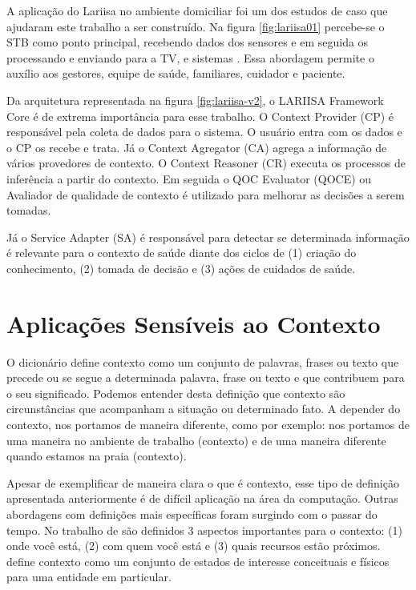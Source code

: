 A aplicação do Lariisa no ambiente domiciliar foi um dos estudos de caso que ajudaram
este trabalho a ser construído. Na figura \ref{fig:lariisa01} percebe-se o STB como 
ponto principal, recebendo dados dos sensores e em seguida os processando e enviando
para a TV, \smartphones[] e sistemas \web. Essa abordagem permite o auxílio aos
gestores, equipe de saúde, familiares, cuidador e paciente.


Da arquitetura representada na figura \ref{fig:lariisa-v2}, o LARIISA Framework
Core é de extrema importância para esse trabalho. O Context Provider (CP) é
responsável pela coleta de dados para o sistema. O usuário entra com os dados
e o CP os recebe e trata. Já o Context Agregator (CA) agrega a informação de
vários provedores de contexto. O Context Reasoner (CR) executa os processos de
inferência a partir do contexto. Em seguida o QOC Evaluator (QOCE) ou Avaliador
de qualidade de contexto é utilizado para melhorar as decisões a serem
tomadas. 

Já o Service Adapter (SA) é responsável para detectar se determinada informação
é relevante para o contexto de saúde diante dos ciclos de (1) criação do
conhecimento, (2) tomada de decisão e (3) ações de cuidados de saúde.

\section{Aplicações Sensíveis ao Contexto}\label{sec:contexto}

O dicionário  define contexto como um conjunto de palavras, frases ou
texto que precede ou se segue a determinada palavra, frase ou texto e que
contribuem para o seu significado. Podemos entender desta definição que contexto
são circunstâncias que acompanham a situação ou determinado fato. A depender do
contexto, nos portamos de maneira diferente, como por exemplo: nos portamos de
uma maneira no ambiente de trabalho (contexto) e de uma maneira diferente quando
estamos na praia (contexto).

Apesar de exemplificar de maneira clara o que é contexto, esse tipo de definição
apresentada anteriormente é de difícil aplicação na área da computação.
Outras abordagens com definições mais específicas foram surgindo com o
passar do tempo. No trabalho de  são definidos 3 aspectos
importantes para o contexto: (1) onde você está, (2) com quem você está e (3)
quais recursos estão próximos.  define contexto 
como um conjunto de estados de interesse conceituais e físicos para uma entidade 
em particular.

